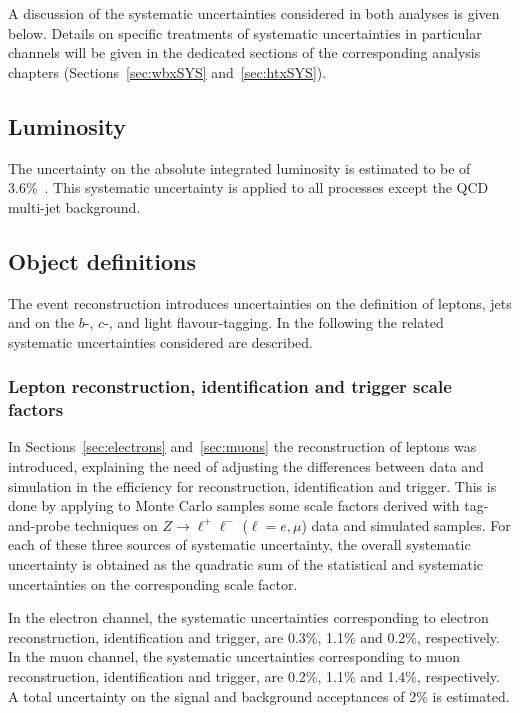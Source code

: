 A discussion of the  systematic uncertainties considered in
both analyses is given below.
Details on specific treatments of systematic uncertainties in particular channels will
be given in the dedicated sections of the corresponding analysis chapters 
(Sections~\ref{sec:wbxSYS} and~\ref{sec:htxSYS}).



\subsection{Luminosity}
\label{sec:syst_lumi}
The uncertainty on the absolute integrated luminosity is estimated to be
of 3.6\%~\cite{lumi}. This systematic uncertainty
is applied to all processes except the QCD multi-jet background.

\subsection{Object definitions}
\label{sec:syst_objects}
The event reconstruction introduces uncertainties on the definition of
leptons, jets and on the $b$-, $c$-, and light flavour-tagging. In the
following the related systematic uncertainties considered are described.

\subsubsection{Lepton reconstruction, identification and trigger scale factors}
\label{sec:syst_lepID}

In Sections~\ref{sec:electrons} and~\ref{sec:muons} the reconstruction
of leptons was introduced, explaining the need of adjusting the
differences between data and simulation in the efficiency for
reconstruction, identification and trigger. This is done by
applying to Monte Carlo samples some scale factors derived 
with tag-and-probe techniques 
on $Z\to \ell^+\ell^-$ ($\ell=e,\mu$) data and simulated samples.
For each of these three sources of systematic uncertainty, 
the overall systematic uncertainty is obtained 
as the quadratic sum of the statistical
and systematic uncertainties on the corresponding scale factor.

In the electron channel, the systematic uncertainties corresponding to
electron reconstruction, identification and trigger, are 0.3\%, 1.1\% 
and 0.2\%, respectively.
In the muon channel, the systematic uncertainties corresponding to
muon reconstruction, identification and trigger, are 0.2\%, 1.1\% and 1.4\%, 
respectively.
A total uncertainty on the signal and background acceptances of 2\% is estimated.


